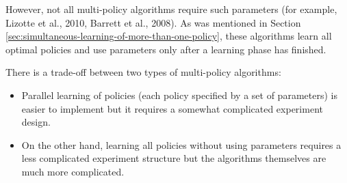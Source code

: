 However, not all multi-policy algorithms require such parameters (for example, Lizotte et al., 2010, Barrett et al., 2008). As was mentioned in Section \ref{sec:simultaneous-learning-of-more-than-one-policy}, these algorithms learn all optimal policies and use parameters only after a learning phase has finished.

There is a trade-off between two types of multi-policy algorithms:
\begin{itemize}
  \item Parallel learning of policies (each policy specified by a set of parameters) is easier to implement but it requires a somewhat complicated experiment design.
  \item On the other hand, learning all policies without using parameters requires a less complicated experiment structure but the algorithms themselves are much more complicated.
\end{itemize}
%
%
%
